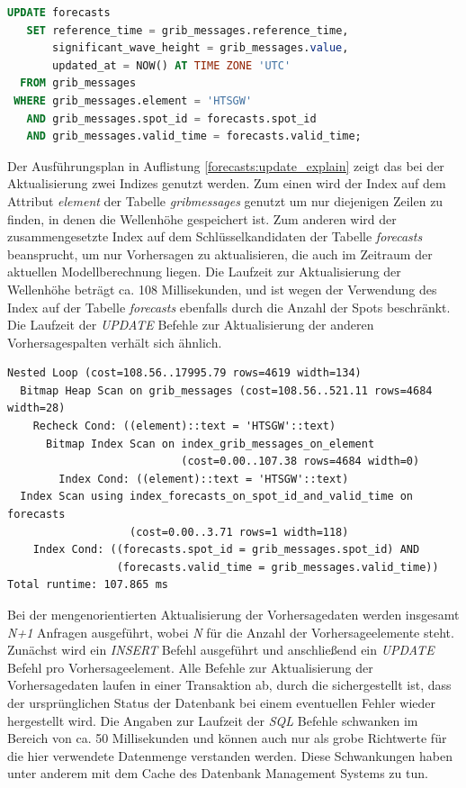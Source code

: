 \begin{lstlisting}[captionpos=b, caption=Aktualisierung der Wellenhöhe, label=forecasts:update, language=SQL]
UPDATE forecasts
   SET reference_time = grib_messages.reference_time,
       significant_wave_height = grib_messages.value,
       updated_at = NOW() AT TIME ZONE 'UTC'
  FROM grib_messages
 WHERE grib_messages.element = 'HTSGW'
   AND grib_messages.spot_id = forecasts.spot_id
   AND grib_messages.valid_time = forecasts.valid_time;
\end{lstlisting}

Der Ausführungsplan in Auflistung \ref{forecasts:update_explain} zeigt
das bei der Aktualisierung zwei Indizes genutzt werden. Zum einen wird
der Index auf dem Attribut \textit{element} der Tabelle
\textit{grib\textunderscore messages} genutzt um nur diejenigen Zeilen
zu finden, in denen die Wellenhöhe gespeichert ist. Zum anderen wird
der zusammengesetzte Index auf dem Schlüsselkandidaten der Tabelle
\textit{forecasts} beansprucht, um nur Vorhersagen zu aktualisieren,
die auch im Zeitraum der aktuellen Modellberechnung liegen. Die
Laufzeit zur Aktualisierung der Wellenhöhe beträgt ca. 108
Millisekunden, und ist wegen der Verwendung des Index auf der Tabelle
\textit{forecasts} ebenfalls durch die Anzahl der Spots
beschränkt. Die Laufzeit der \textit{UPDATE} Befehle zur
Aktualisierung der anderen Vorhersagespalten verhält sich ähnlich.

\begin{lstlisting}[captionpos=b, caption=Ausführungsplan der Aktualisierung, label=forecasts:update_explain]
Nested Loop (cost=108.56..17995.79 rows=4619 width=134)
  Bitmap Heap Scan on grib_messages (cost=108.56..521.11 rows=4684 width=28)
    Recheck Cond: ((element)::text = 'HTSGW'::text)
      Bitmap Index Scan on index_grib_messages_on_element  
                           (cost=0.00..107.38 rows=4684 width=0)
        Index Cond: ((element)::text = 'HTSGW'::text)
  Index Scan using index_forecasts_on_spot_id_and_valid_time on forecasts 
                   (cost=0.00..3.71 rows=1 width=118)
    Index Cond: ((forecasts.spot_id = grib_messages.spot_id) AND 
                 (forecasts.valid_time = grib_messages.valid_time))
Total runtime: 107.865 ms
\end{lstlisting}

Bei der mengenorientierten Aktualisierung der Vorhersagedaten werden
insgesamt \textit{N+1} Anfragen ausgeführt, wobei \textit{N} für die
Anzahl der Vorhersageelemente steht. Zunächst wird ein \textit{INSERT}
Befehl ausgeführt und anschließend ein \textit{UPDATE} Befehl pro
Vorhersageelement. Alle Befehle zur Aktualisierung der Vorhersagedaten
laufen in einer Transaktion ab, durch die sichergestellt ist, dass der
ursprünglichen Status der Datenbank bei einem eventuellen Fehler
wieder hergestellt wird. Die Angaben zur Laufzeit der \textit{SQL}
Befehle schwanken im Bereich von ca. 50 Millisekunden und können auch
nur als grobe Richtwerte für die hier verwendete Datenmenge verstanden
werden. Diese Schwankungen haben unter anderem mit dem Cache des
Datenbank Management Systems zu tun.


